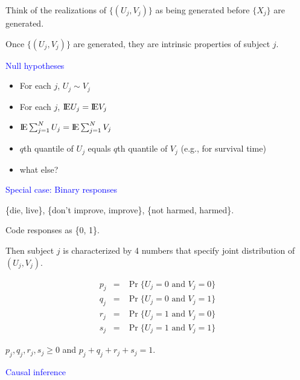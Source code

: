 \documentclass[landscape]{slides}
\newcommand{\EE}{\hbox{I\kern-.1667em\hbox{E}}}
\begin{document}
\begin{slide}
\begin{slide}
Think of the realizations of $\{ (U_j, V_j) \}$ as being generated 
before $\{ X_j \}$ are generated.

Once $\{ (U_j, V_j) \}$ are generated, they are intrinsic properties of
subject $j$.


\end{slide}

\begin{slide}
{\textcolor{blue}{Null hypotheses}}

\begin{itemize}
    \item  For each $j$, $U_j \sim V_j$
    \item For each $j$, $\EE U_j = \EE V_j$
    \item $\EE \sum_{j=1}^N U_j = \EE \sum_{j=1}^N V_j$
    \item $q$th quantile of $U_j$ equals $q$th quantile of $V_j$ (e.g., for survival time)
    \item what else?
\end{itemize}

\end{slide}


\begin{slide}
{\textcolor{blue}{Special case: Binary responses}}

\{die, live\}, \{don't improve, improve\}, \{not harmed, harmed\}.

Code responses as \{0, 1\}.

Then subject $j$ is characterized by 4 numbers that specify 
joint distribution of $(U_j, V_j)$.

\begin{eqnarray}
    p_j &=& \Pr \{U_j = 0 \mbox{ and } V_j = 0\} \nonumber \\
    q_j &=& \Pr \{U_j = 0 \mbox{ and } V_j = 1\} \nonumber \\
    r_j &=& \Pr \{U_j = 1 \mbox{ and } V_j = 0\} \nonumber \\
    s_j &=& \Pr \{U_j = 1 \mbox{ and } V_j = 1\} 
\end{eqnarray}

$p_j, q_j, r_j, s_j \ge 0$ and $p_j + q_j + r_j + s_j = 1$.

\end{slide}

\begin{slide}{\textcolor{blue}{Causal inference}}


\end{slide}
\end{slide}
\end{document}
